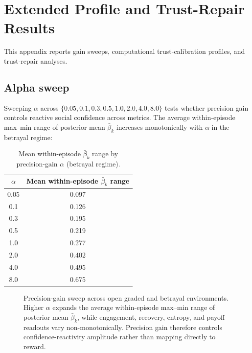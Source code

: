 \section{Extended Profile and Trust-Repair Results}
\label{app:extended_results}

This appendix reports gain sweeps, computational trust-calibration profiles, and trust-repair analyses.

\subsection{Alpha sweep}
\label{sec:phenotypes_alpha}

Sweeping $\alpha$ across $\{0.05, 0.1, 0.3, 0.5, 1.0, 2.0, 4.0, 8.0\}$ tests whether precision gain controls reactive social confidence across metrics. The average within-episode max--min range of posterior mean $\bar{\beta}_k$ increases monotonically with $\alpha$ in the betrayal regime:

\begin{table}[H]
\centering
\caption{Mean within-episode $\bar{\beta}_k$ range by precision-gain $\alpha$ (betrayal regime).}
\label{tab:alpha_sweep}
\begin{tabular}{cc}
\toprule
$\alpha$ & Mean within-episode $\bar{\beta}_k$ range \\
\midrule
0.05 & 0.097 \\
0.1  & 0.126 \\
0.3  & 0.195 \\
0.5  & 0.219 \\
1.0  & 0.277 \\
2.0  & 0.402 \\
4.0  & 0.495 \\
8.0  & 0.675 \\
\bottomrule
\end{tabular}
\end{table}

\begin{figure}[H]
\centering
{}
\caption{Precision-gain sweep across open graded and betrayal environments. Higher $\alpha$ expands the average within-episode max--min range of posterior mean $\bar{\beta}_k$, while engagement, recovery, entropy, and payoff readouts vary non-monotonically. Precision gain therefore controls confidence-reactivity amplitude rather than mapping directly to reward.}
\label{fig:alpha_sweep_appendix}
\end{figure}
\appendixfloattosection

